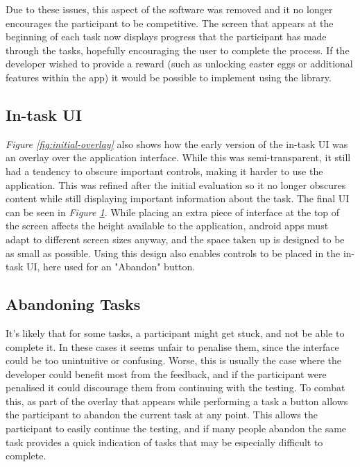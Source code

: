 Due to these issues, this aspect of the software was removed and it no longer encourages
the participant to be competitive. The screen that appears at the beginning of each task now displays
progress that the participant has made through the tasks, hopefully encouraging
the user to complete the process. If the developer wished to provide a reward (such as
unlocking easter eggs or additional features within the app) it would be possible to implement using
the library.

\subsection{In-task UI}

\emph{Figure \ref{fig:initial-overlay}} also shows how the early version of the in-task UI was an overlay over the application interface. While this was semi-transparent, it still had a tendency to obscure important controls, making it harder to use the application. This was refined after the initial evaluation so it no longer obscures content while still displaying important information about the task. The final UI can be seen in \emph{Figure \ref{fig:final-task-overlay}}. While placing an extra piece of interface at the top of the screen affects the height available to the application, android apps must adapt to different screen sizes anyway, and the space taken up is designed to be as small as possible. Using this design also enables controls to be placed in the in-task UI, here used for an "Abandon" button.

\begin{figure}
  \centering
  \label{fig:final-task-overlay}
\end{figure}

\subsection{Abandoning Tasks}

It's likely that for some tasks, a participant might get stuck, and not be able
to complete it. In these cases it seems unfair to penalise them, since the
interface could be too unintuitive or confusing. Worse, this is usually the case
where the developer could benefit most from the feedback, and if the participant
were penalised it could discourage them from continuing with the testing. To
combat this, as part of the overlay that appears while performing a task a
button allows the participant to abandon the current task at any point. This allows the participant to easily continue the testing, and if many people abandon the same task provides a quick indication of tasks that may be especially difficult to complete.

